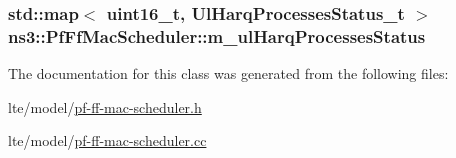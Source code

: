 \subsubsection[{\texorpdfstring{m\+\_\+ul\+Harq\+Processes\+Status}{m_ulHarqProcessesStatus}}]{\setlength{\rightskip}{0pt plus 5cm}std\+::map$<$ uint16\+\_\+t, {\bf Ul\+Harq\+Processes\+Status\+\_\+t} $>$ ns3\+::\+Pf\+Ff\+Mac\+Scheduler\+::m\+\_\+ul\+Harq\+Processes\+Status\hspace{0.3cm}{\ttfamily [private]}}\hypertarget{classns3_1_1PfFfMacScheduler_a5d5e9dcdbb7d0a291fe397ba7b746d04}{}\label{classns3_1_1PfFfMacScheduler_a5d5e9dcdbb7d0a291fe397ba7b746d04}


The documentation for this class was generated from the following files\+:\begin{DoxyCompactItemize}
\item 
lte/model/\hyperlink{lte_2model_2pf-ff-mac-scheduler_8h}{pf-\/ff-\/mac-\/scheduler.\+h}\item 
lte/model/\hyperlink{lte_2model_2pf-ff-mac-scheduler_8cc}{pf-\/ff-\/mac-\/scheduler.\+cc}\end{DoxyCompactItemize}
